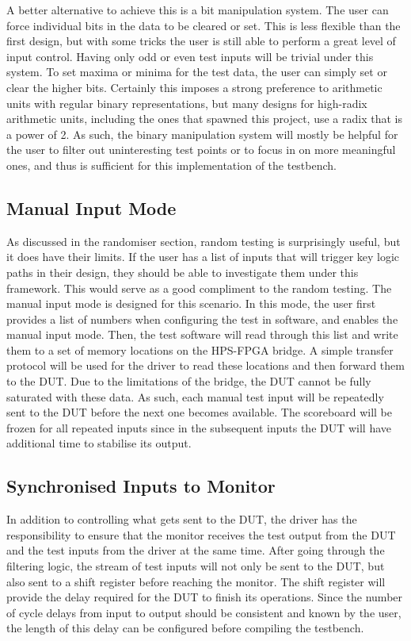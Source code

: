 A better alternative to achieve this is a bit manipulation system.
The user can force individual bits in the data to be cleared or set.
This is less flexible than the first design, but with some tricks the user is still able to perform a great level of input control.
Having only odd or even test inputs will be trivial under this system.
To set maxima or minima for the test data, the user can simply set or clear the higher bits.
Certainly this imposes a strong preference to arithmetic units with regular binary representations, but many designs for high-radix arithmetic units, including the ones that spawned this project, use a radix that is a power of 2.
As such, the binary manipulation system will mostly be helpful for the user to filter out uninteresting test points or to focus in on more meaningful ones, and thus is sufficient for this implementation of the testbench.

\subsection{Manual Input Mode}

As discussed in the randomiser section, random testing is surprisingly useful, but it does have their limits.
If the user has a list of inputs that will trigger key logic paths in their design, they should be able to investigate them under this framework.
This would serve as a good compliment to the random testing.
The manual input mode is designed for this scenario.
In this mode, the user first provides a list of numbers when configuring the test in software, and enables the manual input mode.
Then, the test software will read through this list and write them to a set of memory locations on the HPS-FPGA bridge.
A simple transfer protocol will be used for the driver to read these locations and then forward them to the DUT.
Due to the limitations of the bridge, the DUT cannot be fully saturated with these data.
As such, each manual test input will be repeatedly sent to the DUT before the next one becomes available.
The scoreboard will be frozen for all repeated inputs since in the subsequent inputs the DUT will have additional time to stabilise its output.

\subsection{Synchronised Inputs to Monitor}
In addition to controlling what gets sent to the DUT, the driver has the responsibility to ensure that the monitor receives the test output from the DUT and the test inputs from the driver at the same time.
After going through the filtering logic, the stream of test inputs will not only be sent to the DUT, but also sent to a shift register before reaching the monitor.
The shift register will provide the delay required for the DUT to finish its operations.
Since the number of cycle delays from input to output should be consistent and known by the user, the length of this delay can be configured before compiling the testbench.


